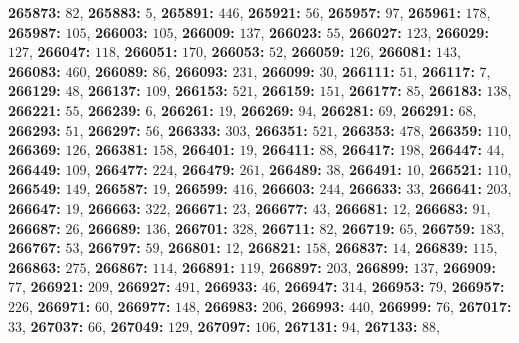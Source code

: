 \textsf{\bfseries 265873:} $82$, \textsf{\bfseries 265883:} $5$, \textsf{\bfseries 265891:} $446$, \textsf{\bfseries 265921:} $56$, \textsf{\bfseries 265957:} $97$, \textsf{\bfseries 265961:} $178$, \textsf{\bfseries 265987:} $105$, \textsf{\bfseries 266003:} $105$, \textsf{\bfseries 266009:} $137$, \textsf{\bfseries 266023:} $55$, \textsf{\bfseries 266027:} $123$, \textsf{\bfseries 266029:} $127$, \textsf{\bfseries 266047:} $118$, \textsf{\bfseries 266051:} $170$, \textsf{\bfseries 266053:} $52$, \textsf{\bfseries 266059:} $126$, \textsf{\bfseries 266081:} $143$, \textsf{\bfseries 266083:} $460$, \textsf{\bfseries 266089:} $86$, \textsf{\bfseries 266093:} $231$, \textsf{\bfseries 266099:} $30$, \textsf{\bfseries 266111:} $51$, \textsf{\bfseries 266117:} $7$, \textsf{\bfseries 266129:} $48$, \textsf{\bfseries 266137:} $109$, \textsf{\bfseries 266153:} $521$, \textsf{\bfseries 266159:} $151$, \textsf{\bfseries 266177:} $85$, \textsf{\bfseries 266183:} $138$, \textsf{\bfseries 266221:} $55$, \textsf{\bfseries 266239:} $6$, \textsf{\bfseries 266261:} $19$, \textsf{\bfseries 266269:} $94$, \textsf{\bfseries 266281:} $69$, \textsf{\bfseries 266291:} $68$, \textsf{\bfseries 266293:} $51$, \textsf{\bfseries 266297:} $56$, \textsf{\bfseries 266333:} $303$, \textsf{\bfseries 266351:} $521$, \textsf{\bfseries 266353:} $478$, \textsf{\bfseries 266359:} $110$, \textsf{\bfseries 266369:} $126$, \textsf{\bfseries 266381:} $158$, \textsf{\bfseries 266401:} $19$, \textsf{\bfseries 266411:} $88$, \textsf{\bfseries 266417:} $198$, \textsf{\bfseries 266447:} $44$, \textsf{\bfseries 266449:} $109$, \textsf{\bfseries 266477:} $224$, \textsf{\bfseries 266479:} $261$, \textsf{\bfseries 266489:} $38$, \textsf{\bfseries 266491:} $10$, \textsf{\bfseries 266521:} $110$, \textsf{\bfseries 266549:} $149$, \textsf{\bfseries 266587:} $19$, \textsf{\bfseries 266599:} $416$, \textsf{\bfseries 266603:} $244$, \textsf{\bfseries 266633:} $33$, \textsf{\bfseries 266641:} $203$, \textsf{\bfseries 266647:} $19$, \textsf{\bfseries 266663:} $322$, \textsf{\bfseries 266671:} $23$, \textsf{\bfseries 266677:} $43$, \textsf{\bfseries 266681:} $12$, \textsf{\bfseries 266683:} $91$, \textsf{\bfseries 266687:} $26$, \textsf{\bfseries 266689:} $136$, \textsf{\bfseries 266701:} $328$, \textsf{\bfseries 266711:} $82$, \textsf{\bfseries 266719:} $65$, \textsf{\bfseries 266759:} $183$, \textsf{\bfseries 266767:} $53$, \textsf{\bfseries 266797:} $59$, \textsf{\bfseries 266801:} $12$, \textsf{\bfseries 266821:} $158$, \textsf{\bfseries 266837:} $14$, \textsf{\bfseries 266839:} $115$, \textsf{\bfseries 266863:} $275$, \textsf{\bfseries 266867:} $114$, \textsf{\bfseries 266891:} $119$, \textsf{\bfseries 266897:} $203$, \textsf{\bfseries 266899:} $137$, \textsf{\bfseries 266909:} $77$, \textsf{\bfseries 266921:} $209$, \textsf{\bfseries 266927:} $491$, \textsf{\bfseries 266933:} $46$, \textsf{\bfseries 266947:} $314$, \textsf{\bfseries 266953:} $79$, \textsf{\bfseries 266957:} $226$, \textsf{\bfseries 266971:} $60$, \textsf{\bfseries 266977:} $148$, \textsf{\bfseries 266983:} $206$, \textsf{\bfseries 266993:} $440$, \textsf{\bfseries 266999:} $76$, \textsf{\bfseries 267017:} $33$, \textsf{\bfseries 267037:} $66$, \textsf{\bfseries 267049:} $129$, \textsf{\bfseries 267097:} $106$, \textsf{\bfseries 267131:} $94$, \textsf{\bfseries 267133:} $88$, 
